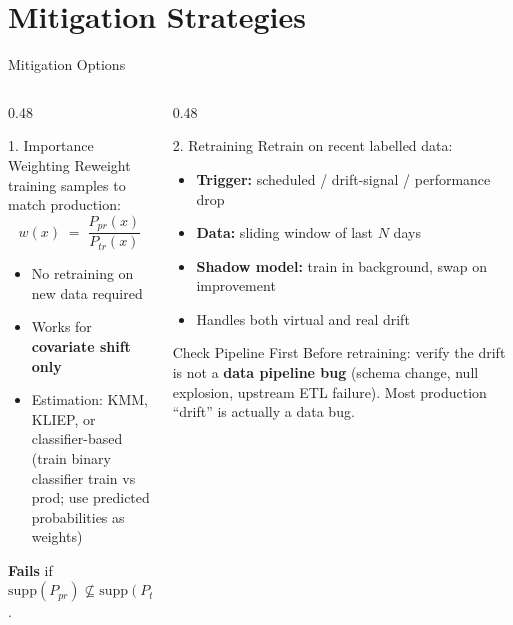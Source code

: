 \documentclass[10pt,aspectratio=169]{beamer}
\begin{document}
\section{Mitigation Strategies}

\begin{frame}{Mitigation Options}
  \begin{columns}[T]
    \begin{column}{0.48\textwidth}
      \begin{block}{1. Importance Weighting}
        Reweight training samples to match production:\\[4pt]
        \[
          w(x) \;=\; \frac{P_{pr}(x)}{P_{tr}(x)}
        \]
        \begin{itemize}
          \item No retraining on new data required
          \item Works for \textbf{covariate shift only}
          \item Estimation: KMM, KLIEP, or classifier-based\\
                (train binary classifier train vs prod; use predicted probabilities as weights)
        \end{itemize}
        \textbf{Fails} if $\mathrm{supp}(P_{pr}) \not\subseteq \mathrm{supp}(P_{tr})$.
      \end{block}
    \end{column}
    \begin{column}{0.48\textwidth}
      \begin{block}{2. Retraining}
        Retrain on recent labelled data:
        \begin{itemize}
          \item \textbf{Trigger:} scheduled / drift-signal / performance drop
          \item \textbf{Data:} sliding window of last $N$ days
          \item \textbf{Shadow model:} train in background, swap on improvement
          \item Handles both virtual and real drift
        \end{itemize}
      \end{block}
      \vspace{0.2cm}
      \begin{alertblock}{Check Pipeline First}
        Before retraining: verify the drift is not a \textbf{data pipeline bug} (schema change, null explosion, upstream ETL failure). Most production ``drift'' is actually a data bug.
      \end{alertblock}
    \end{column}
  \end{columns}
\end{frame}
\end{document}
